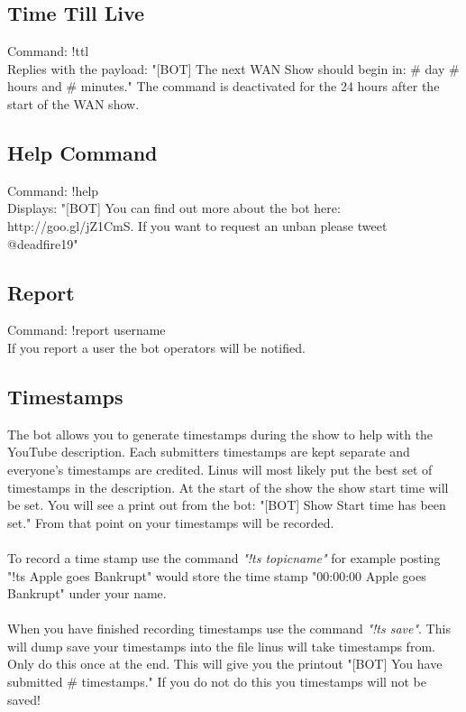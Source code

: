 \documentclass[10pt]{article}
\begin{document}
\subsection{Time Till Live}
Command: !ttl\\
Replies with the payload: "[BOT] The next WAN Show should begin in: \# day \# hours and \# minutes."
The command is deactivated for the 24 hours after the start of the WAN show.
\subsection{Help Command}
Command: !help\\
Displays: "[BOT] You can find out more about the bot here: http://goo.gl/jZ1CmS. If you want to request an unban please tweet @deadfire19"
\subsection{Report}
Command: !report username\\
If you report a user the bot operators will be notified.
\subsection{Timestamps}
The bot allows you to generate timestamps during the show to help with the YouTube description. Each submitters timestamps are kept separate and everyone's timestamps are credited. Linus will most likely put the best set of timestamps in the description. At the start of the show the show start time will be set. You will see a print out from the bot: "[BOT] Show Start time has been set." From that point on your timestamps will be recorded.\\\\
 
To record a time stamp use the command \emph{"!ts topicname"} for example posting  "!ts Apple goes Bankrupt" would store the time stamp "00:00:00 Apple goes Bankrupt" under your name.
 \\\\
When you have finished recording timestamps use the command \emph{"!ts save"}. This will dump save your timestamps into the file linus will take timestamps from. Only do this once at the end. This will give you the printout "[BOT] You have submitted \# timestamps." If you do not do this you timestamps will not be saved!
\end{document}
